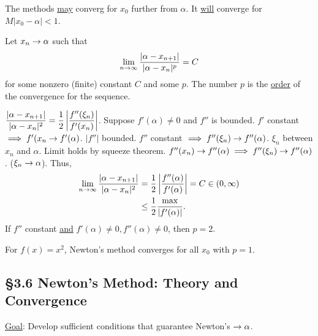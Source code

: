 \documentclass[]{article}
\begin{document}
\begin{note}
	The methods \ul{may} converg for $x_0$ further from $\alpha$. It \ul{will} converge for $M|x_0-\alpha|<1$.
\end{note}

\begin{definition}
	Let $x_n\rightarrow\alpha$ such that $$\lim_{n\rightarrow\infty} \frac{|\alpha-x_{n+1}|}{|\alpha-x_n|^p}=C$$ for some nonzero (finite) constant $C$ and some $p$.
	The number $p$ is the \ul{order} of the convergence for the sequence.
\end{definition}
\begin{example}
	[Newton's] $\displaystyle \frac{|\alpha-x_{n+1}|}{|\alpha-x_n|^2} = \frac12\left|\frac{f''(\xi_n)}{f'(x_n)}\right|$.
	Suppose $f'(\alpha)\neq0$ and $f''$ is bounded. $f'$ constant $\implies f'(x_n\rightarrow f'(\alpha)$. $|f''|$ bounded. $f''$ constant $\implies f''(\xi_n)\rightarrow f''(\alpha)$.
	$\xi_n$ between $x_n$ and $\alpha$. Limit holds by squeeze theorem.
	$f''(x_n)\rightarrow f''(\alpha) \implies f''(\xi_n)\rightarrow f''(\alpha)$. ($\xi_n\rightarrow\alpha$).
	Thus, 
	\begin{align*}
		\lim_{n\rightarrow\infty} \frac{|\alpha-x_{n+1}|}{|\alpha-x_n|^2} &= \frac12\left|\frac{f''(\alpha)}{f'(\alpha)}\right| = C\in(0,\infty) \\
																  &\leq\frac12\frac{\max}{|f'(\alpha)|}.
	\end{align*}
	If $f''$ constant \ul{and} $f'(\alpha)\neq0,f''(\alpha)\neq0$, then \ul{$p=2$}.
\end{example}
\begin{example}
	For $f(x)=x^2$, Newton's method converges for all $x_0$ with $p=1$.
\end{example}

\subsection*{\S3.6 Newton's Method: Theory and Convergence}

\ul{Goal}: Develop sufficient conditions that guarantee Newton's $\rightarrow\alpha$.
\end{document}
